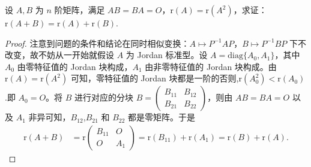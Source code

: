 \documentclass[../../main.tex]{subfiles}
\begin{document}
\begin{proposition}\label{proposition:r(A+B)=r(A)+r(B)}
设 $A,B$ 为 $n$ 阶矩阵，满足 $AB = BA = O$，$\mathrm{r}(A) = \mathrm{r}(A^2)$，求证：$\mathrm{r}(A + B) = \mathrm{r}(A) + \mathrm{r}(B)$.
\end{proposition}
\begin{proof}
注意到问题的条件和结论在同时相似变换：$A\mapsto P^{-1}AP$，$B\mapsto P^{-1}BP$ 下不改变，故不妨从一开始就假设 $A$ 为 Jordan 标准型。设 $A = \mathrm{diag}\{A_0,A_1\}$，其中 $A_0$ 由零特征值的 Jordan 块构成，$A_1$ 由非零特征值的 Jordan 块构成。由 $\mathrm{r}(A) = \mathrm{r}(A^2)$ 可知，零特征值的 Jordan 块都是一阶的否则,$\mathrm{r}(A^2_0)<\mathrm{r}(A_0)$.即 $A_0 = O$。将 $B$ 进行对应的分块 $B = \begin{pmatrix}B_{11}&B_{12}\\B_{21}&B_{22}\end{pmatrix}$，则由 $AB = BA = O$ 以及 $A_1$ 非异可知，$B_{12}$,$B_{21}$ 和 $B_{22}$ 都是零矩阵。于是
\begin{align*}
\mathrm{r}(A + B) &= \mathrm{r}\begin{pmatrix}B_{11}&O\\O&A_1\end{pmatrix} = \mathrm{r}(B_{11}) + \mathrm{r}(A_1) = \mathrm{r}(B) + \mathrm{r}(A).
\end{align*}
\end{proof}
\end{document}
